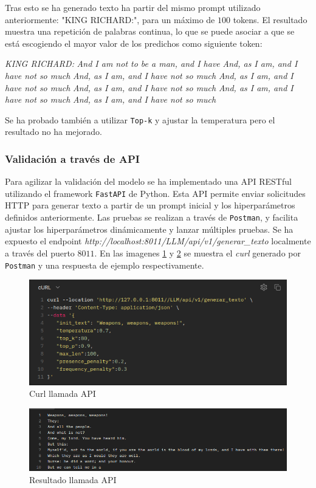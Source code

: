 \documentclass[11pt]{book}
\begin{document}
Tras esto se ha generado texto ha partir del mismo prompt utilizado anteriormente: "KING RICHARD:", para un máximo de $100$ tokens. El resultado muestra una repetición de palabras continua, lo que se puede asociar a que se está escogiendo el mayor valor de los predichos como siguiente token: 

\textit{KING RICHARD:}
\textit{And I am not to be a man, and I have}
\textit{And, as I am, and I have not so much}
\textit{And, as I am, and I have not so much}
\textit{And, as I am, and I have not so much}
\textit{And, as I am, and I have not so much}
\textit{And, as I am, and I have not so much}
\textit{And, as I am, and I have not so much}

Se ha probado también a utilizar \texttt{Top-k} y ajustar la temperatura pero el resultado no ha mejorado.

\subsubsection{Validación a través de API}

Para agilizar la validación del modelo se ha implementado una API RESTful utilizando el framework \texttt{FastAPI} de Python. Esta API permite enviar solicitudes HTTP para generar texto a partir de un prompt inicial y los hiperparámetros definidos anteriormente. Las pruebas se realizan a través de \texttt{Postman}, y facilita ajustar los hiperparámetros dinámicamente y lanzar múltiples pruebas. Se ha expuesto el endpoint \textit{http://localhost:8011/LLM/api/v1/generar\_texto} localmente a través del puerto $8011$. En las imagenes \ref{fig:placeholder27} y \ref{fig:placeholder28} se muestra el \textit{curl} generado por \texttt{Postman} y una respuesta de ejemplo respectivamente.

\begin{figure}[h]
    \centering
    \includegraphics[width=0.5\linewidth]{img/api_curl.png}
    \caption{Curl llamada API}
    \label{fig:placeholder27}
\end{figure}

\begin{figure}[h]
    \centering
    \includegraphics[width=0.5\linewidth]{img/api_res.png}
    \caption{Resultado llamada API}
    \label{fig:placeholder28}
\end{figure}
\end{document}
